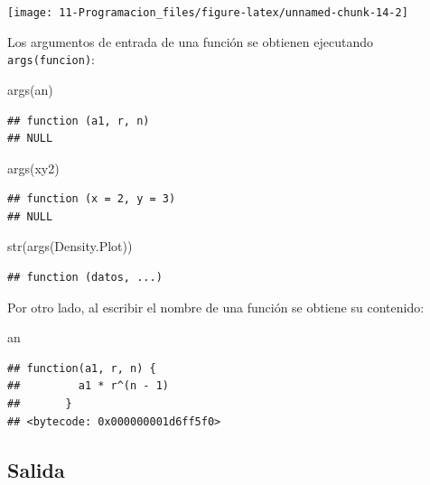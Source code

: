 \documentclass[
]{book}
\newenvironment{Shaded}{\begin{snugshade}}{\end{snugshade}}
\newcommand{\FunctionTok}[1]{\textcolor[rgb]{0.00,0.00,0.00}{#1}}
\newcommand{\NormalTok}[1]{#1}
\theoremstyle{break}
\theoremstyle{nonumberplain}
\begin{document}
\begin{center}\texttt{[image: 11-Programacion\_files/figure-latex/unnamed-chunk-14-2]} \end{center}

Los argumentos de entrada de una función se obtienen ejecutando \texttt{args(funcion)}:

\begin{Shaded}
\begin{Highlighting}[]
\FunctionTok{args}\NormalTok{(an)}
\end{Highlighting}
\end{Shaded}

\begin{verbatim}
## function (a1, r, n) 
## NULL
\end{verbatim}

\begin{Shaded}
\begin{Highlighting}[]
\FunctionTok{args}\NormalTok{(xy2)}
\end{Highlighting}
\end{Shaded}

\begin{verbatim}
## function (x = 2, y = 3) 
## NULL
\end{verbatim}

\begin{Shaded}
\begin{Highlighting}[]
\FunctionTok{str}\NormalTok{(}\FunctionTok{args}\NormalTok{(Density.Plot))}
\end{Highlighting}
\end{Shaded}

\begin{verbatim}
## function (datos, ...)
\end{verbatim}

Por otro lado, al escribir el nombre de una función se obtiene su
contenido:

\begin{Shaded}
\begin{Highlighting}[]
\NormalTok{an}
\end{Highlighting}
\end{Shaded}

\begin{verbatim}
## function(a1, r, n) {
##         a1 * r^(n - 1)
##       }
## <bytecode: 0x000000001d6ff5f0>
\end{verbatim}

\hypertarget{salida}{%
\subsection{Salida}\label{salida}}
\end{document}
